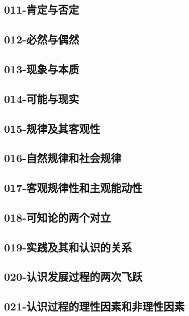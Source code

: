 \subsection{011-肯定与否定}

\subsection{012-必然与偶然}

\subsection{013-现象与本质}

\subsection{014-可能与现实}

\subsection{015-规律及其客观性}

\subsection{016-自然规律和社会规律}

\subsection{017-客观规律性和主观能动性}

\subsection{018-可知论的两个对立}

\subsection{019-实践及其和认识的关系}

\subsection{020-认识发展过程的两次飞跃}

\subsection{021-认识过程的理性因素和非理性因素}

